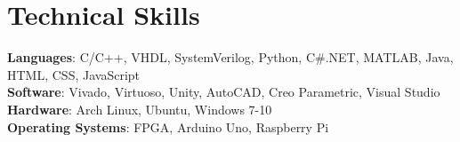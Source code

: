 \documentclass[letterpaper,11pt]{article}
\makeatletter
\newcommand{\resumeItem}[1]{
  \item\small{
    {#1 \vspace{-2pt}}
  }
}
\newcommand{\resumeSubheading}[4]{
  \vspace{-2pt}\item
    \begin{tabular*}{1.0\textwidth}[t]{l@{\extracolsep{\fill}}r}
      \textbf{#1} & \textbf{\small #2} \\
      \textit{\small#3} & \textit{\small #4} \\
    \end{tabular*}\vspace{-7pt}
}
\newcommand{\resumeSubHeadingListStart}{\begin{itemize}[leftmargin=0.0in, label={}]}
\newcommand{\resumeSubHeadingListEnd}{\end{itemize}}
\newcommand{\resumeItemListStart}{\begin{itemize}}
\newcommand{\resumeItemListEnd}{\end{itemize}\vspace{-5pt}}
\makeatother
\begin{document}
\section{Technical Skills}
 \begin{itemize}[leftmargin=0.15in, label={}]
    \small{\item{
     \textbf{Languages}{: C/C++, VHDL, SystemVerilog, Python, C\#.NET, MATLAB, Java, HTML, CSS, JavaScript} \\
     \textbf{Software}{: Vivado, Virtuoso, Unity, AutoCAD, Creo Parametric, Visual Studio} \\
     \textbf{Hardware}{: Arch Linux, Ubuntu, Windows 7-10} \\
     \textbf{Operating Systems}{: FPGA, Arduino Uno, Raspberry Pi} \\
    }}
 \end{itemize}

%
\end{document}
